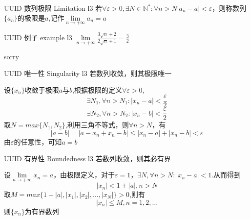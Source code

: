 \documentclass[UTF8, 10pt]{ctexart}
\begin{document}
        \begin{dfn}
            {UUID}
            {数列极限}
            {Limitation}
            {l3}
            若$\forall \varepsilon > 0 , \exists N \in \mathbb{N}^* : \forall n > N |a_n - a| < \varepsilon$，则称数列$\{ a_n \}$的极限是$a$,记作$\lim\limits_{n \to +\infty } a_n = a$
        \end{dfn}

        \begin{xmp}
            {UUID}
            {例子}
            {example}
            {l3}
            $\lim\limits_{ n \to + \infty }\frac{3 \sqrt{n} + 2}{2 \sqrt{n} + 1} = \frac{3}{2}$
        \end{xmp}

        \begin{prf}
            sorry
        \end{prf}

        \begin{ppt}
            {UUID}
            {唯一性}
            {Singularity}
            {l3}
            若数列收敛，则其极限唯一
        \end{ppt}

        \begin{prf}
            设$\{ x_n \}$收敛于极限$a$与$b$,根据极限的定义$\forall \varepsilon > 0$,
            $$\exists N_1 , \forall n > N_1 : |x_n - a| < \frac{\varepsilon}{2} $$
            $$\exists N_2 , \forall n > N_2 : |x_n - b| < \frac{\varepsilon}{2} $$
            取$N = max \{ N_1 , N_2 \}$,利用三角不等式，则$\forall n > N$，有
            $$|a-b| = |a- x_n + x_n - b| \le |x_n - a| + |x_n - b| < \varepsilon$$
            由$\varepsilon$的任意性，可知$a=b$
        \end{prf}

        \begin{ppt}
            {UUID}
            {有界性}
            {Boundedness}
            {l3}
            若数列收敛，则其必有界
        \end{ppt}

        \begin{prf}
            设$\lim\limits_{n \to + \infty} x_n = a$，由极限定义，对于$\varepsilon = 1，\exists N,\forall n> N : |x_n - a| < 1$.从而得到
            $$|x_n| < 1 + |a| , n>N$$
            取$M = max \{1+|a|,|x_1|,|x_2|,\ldots ,|x_N|\} > 0$,则有
            $$|x_n| \le  M , n = 1,2,\ldots $$
            则$\{ x_n \}$为有界数列
        \end{prf}
\end{document}
